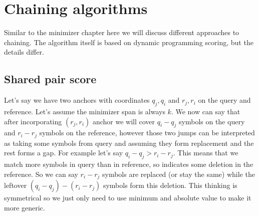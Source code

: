 \raggedbottom


\section{Chaining algorithms}
\label{sec:chaining-algorithm-families}

Similar to the minimizer chapter here we will discuss different approaches to chaining. The algorithm itself is based on dynamic programming scoring, but the details differ.


\subsection{Shared pair score}
\label{sec:chaining-score-model}

Let's say we have two anchors with coordinates $q_j, q_i$ and $r_j, r_i$ on the query and reference.
Let's assume the minimizer span is always $k$. We now can say that after incorporating $(r_j, r_i)$ anchor we will cover $q_i-q_j$ symbols on the query and $r_i-r_j$ symbols on the reference, however those two jumps can be interpreted as
taking some symbols from query and assuming they form replacement and the rest forms a gap. For example let's say $q_i-q_j > r_i-r_j$. This means that we match more symbols in query than in reference, so indicates some deletion in the reference.
So we can say $r_i-r_j$ symbols are replaced (or stay the same) while the leftover $(q_i-q_j)-(r_i-r_j)$ symbols form this deletion. This thinking is symmetrical so we just only need to use minimum and absolute value to make it more generic.

